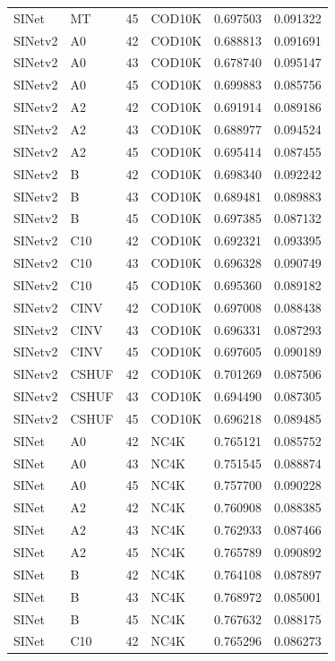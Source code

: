 \begin{table}[h]
\begin{center}
\begin{tabular}{llllcc}
SINet & MT & 45 & COD10K & 0.697503 & 0.091322 \\
SINetv2 & A0 & 42 & COD10K & 0.688813 & 0.091691 \\
SINetv2 & A0 & 43 & COD10K & 0.678740 & 0.095147 \\
SINetv2 & A0 & 45 & COD10K & 0.699883 & 0.085756 \\
SINetv2 & A2 & 42 & COD10K & 0.691914 & 0.089186 \\
SINetv2 & A2 & 43 & COD10K & 0.688977 & 0.094524 \\
SINetv2 & A2 & 45 & COD10K & 0.695414 & 0.087455 \\
SINetv2 & B & 42 & COD10K & 0.698340 & 0.092242 \\
SINetv2 & B & 43 & COD10K & 0.689481 & 0.089883 \\
SINetv2 & B & 45 & COD10K & 0.697385 & 0.087132 \\
SINetv2 & C10 & 42 & COD10K & 0.692321 & 0.093395 \\
SINetv2 & C10 & 43 & COD10K & 0.696328 & 0.090749 \\
SINetv2 & C10 & 45 & COD10K & 0.695360 & 0.089182 \\
SINetv2 & CINV & 42 & COD10K & 0.697008 & 0.088438 \\
SINetv2 & CINV & 43 & COD10K & 0.696331 & 0.087293 \\
SINetv2 & CINV & 45 & COD10K & 0.697605 & 0.090189 \\
SINetv2 & CSHUF & 42 & COD10K & 0.701269 & 0.087506 \\
SINetv2 & CSHUF & 43 & COD10K & 0.694490 & 0.087305 \\
SINetv2 & CSHUF & 45 & COD10K & 0.696218 & 0.089485 \\
SINet & A0 & 42 & NC4K & 0.765121 & 0.085752 \\
SINet & A0 & 43 & NC4K & 0.751545 & 0.088874 \\
SINet & A0 & 45 & NC4K & 0.757700 & 0.090228 \\
SINet & A2 & 42 & NC4K & 0.760908 & 0.088385 \\
SINet & A2 & 43 & NC4K & 0.762933 & 0.087466 \\
SINet & A2 & 45 & NC4K & 0.765789 & 0.090892 \\
SINet & B & 42 & NC4K & 0.764108 & 0.087897 \\
SINet & B & 43 & NC4K & 0.768972 & 0.085001 \\
SINet & B & 45 & NC4K & 0.767632 & 0.088175 \\
SINet & C10 & 42 & NC4K & 0.765296 & 0.086273 \\

\end{tabular}
\end{center}
\end{table}
